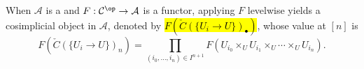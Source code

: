 \begin{definition}
    When $\mathcal{A}$ is a  and $F: \mathcal{C}^{\op} \to \mathcal{A}$ is a functor, applying $F$ levelwise yields a cosimplicial object in $\mathcal{A}$, denoted by \hl{$F(\check{C}(\{U_i \to U\})_\bullet)$}, whose value at $[n]$ is
    $$F(\check{C}(\{U_i \to U\})_n) = \prod_{(i_0,\ldots,i_n) \in I^{n+1}} F(U_{i_0} \times_U U_{i_1} \times_U \cdots \times_U U_{i_n}).$$
\end{definition}